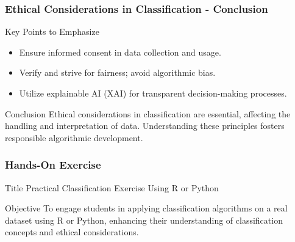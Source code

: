\documentclass[aspectratio=169]{beamer}
\begin{document}
\begin{frame}[fragile]
    \frametitle{Ethical Considerations in Classification - Conclusion}
    \begin{block}{Key Points to Emphasize}
        \begin{itemize}
            \item Ensure informed consent in data collection and usage.
            \item Verify and strive for fairness; avoid algorithmic bias.
            \item Utilize explainable AI (XAI) for transparent decision-making processes.
        \end{itemize}
    \end{block}

    \begin{block}{Conclusion}
        Ethical considerations in classification are essential, affecting the handling and interpretation of data. Understanding these principles fosters responsible algorithmic development.
    \end{block}
\end{frame}

\begin{frame}
    \frametitle{Hands-On Exercise}
    \begin{block}{Title}
        Practical Classification Exercise Using R or Python
    \end{block}

    \begin{block}{Objective}
        To engage students in applying classification algorithms on a real dataset using R or Python, enhancing their understanding of classification concepts and ethical considerations.
    \end{block}
\end{frame}
\end{document}
